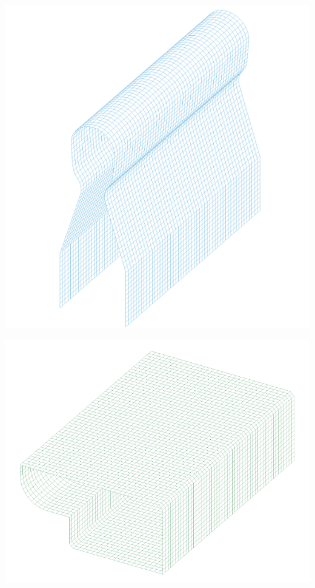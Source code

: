 \begin{center}
\includegraphics[scale=0.6]{src/ch3/mesh_fi.png}
\label{fig:mesh_fi}
\end{center}

\begin{center}
\includegraphics[scale=0.6]{src/ch3/mesh_fs.png}
\label{fig:mesh_fs}
\end{center}

